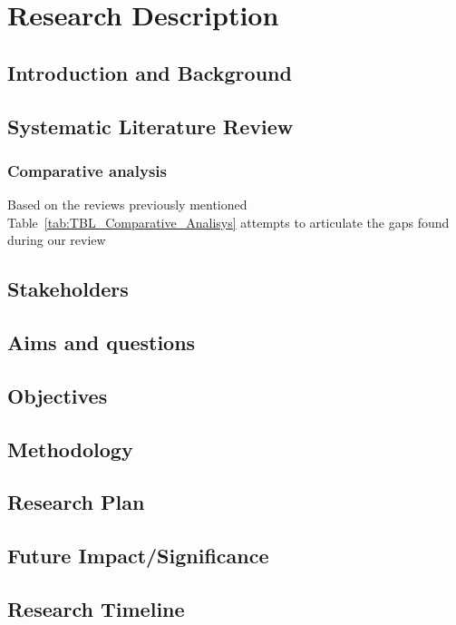 \chapter{Research Description}\label{ch:Intro}

\section{Introduction and Background}\label{sec:disBackground}


\section{Systematic Literature Review}\label{sec:disSLR}




\subsection{Comparative analysis}

Based on the reviews previously mentioned Table~\ref{tab:TBL_Comparative_Analisys} attempts to articulate the gaps found during our review



\section{Stakeholders}\label{sec:disStakeholders}


\section{Aims and questions}\label{sec:disAims}


\section{Objectives}\label{sec:disObjectives}


\section{Methodology}\label{sec:disMethodology}


\section{Research Plan}\label{sec:disResearchPlan}


\section{Future Impact/Significance}\label{sec:disFutureImpact}


\pagebreak

\section{Research Timeline}\label{sec:disResearchTimeline}














